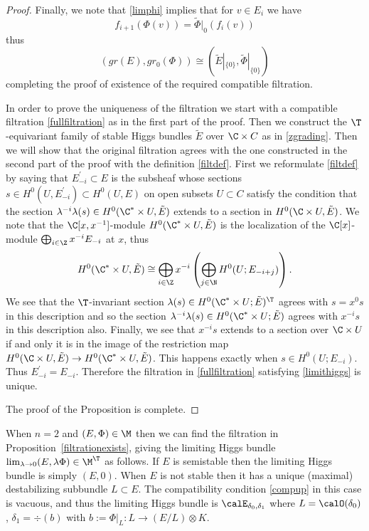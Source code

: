 \begin{proof}
	Finally, we note that \eqref{limphi} implies that for $v\in E_i$ we have $$f_{i+1}(\Phi(v))=\tilde{\Phi}|_0(f_i(v))$$ thus $$(gr(E),gr_0(\Phi))\cong(\tilde{E}|_{\{0\}},\tilde{\Phi}|_{\{0\}})$$ completing the proof of existence of the required compatible filtration.

	In order to prove the uniqueness of the filtration we start with a compatible filtration \eqref{fullfiltration} as in the first part of the proof. Then we construct the $\T$-equivariant family of stable Higgs bundles $\tilde{E}$ over $\C\times C$ as in \eqref{zgrading}. Then we will show that the original filtration agrees with the one constructed in the second part of the proof with the definition \eqref{filtdef}. First we reformulate \eqref{filtdef} by saying that $E^\prime_{-i}\subset E$ is the subsheaf whose sections $s\in H^0(U,E^\prime_{-i})\subset H^0(U,E)$ on open subsets $U\subset C$ satisfy the condition that the section $\lambda^{-i}\lambda(s)\in H^0(\C^*\times U,\tilde{E})$ extends to a section in $H^0(\C\times U,\tilde{E})$. We note that the $\C[x,x^{-1}]$-module $H^0(\C^*\times U,\tilde{E})$ is the localization of the $\C[x]$-module $\bigoplus_{i\in \Z} x^{-i}E_{-i}$  at $x$, thus $$H^0(\C^*\times U,\tilde{E})\cong \bigoplus_{i\in \Z} x^{-i}\left(\bigoplus_{j\in \N} H^0(U;E_{-i+j})\right). $$ We see that the $\T$-invariant section $\lambda(s)\in H^0(\C^*\times U;\tilde{E})^\T$ agrees with $s=x^0s$ in this description  and so the section $\lambda^{-i}\lambda (s)\in H^0(\C^*\times U;\tilde{E}) $ agrees with $x^{-i}s$ in this description also. Finally, we see that $x^{-i}s$ extends to a section over $\C\times U$ if and only it is in the image of the restriction map $H^0(\C\times U, \tilde{E})\to H^0(\C^*\times U, \tilde{E})$. This happens exactly when $s\in H^0(U;E_{-i})$. Thus $E^\prime_{-i}=E_{-i}$. Therefore the filtration in \eqref{fullfiltration}
	satisfying \eqref{limithiggs} is unique.

	The proof of the Proposition is complete.
\end{proof}

\begin{remark}
\notready When $n=2$ and $(E,\Phi)\in \M$ then we can find the filtration in Proposition~\ref{filtrationexists}, giving the limiting Higgs bundle $\lim_{\lambda\to 0}(E,\lambda\Phi)\in \M^\T$ as follows. If $E$ is semistable then the limiting Higgs bundle is simply $(E,0)$. When $E$ is not stable then it has a unique (maximal) destabilizing subbundle $L\subset E$. The compatibility condition \eqref{compup} in this case is vacuous, and thus the limiting Higgs bundle is $\calE_{\delta_0,\delta_1}$ where $L=\calO(\delta_0)$, $\delta_1=\div(b)$ with $b:=\Phi|_L:L\to (E/L)\otimes K$.
\end{remark}

